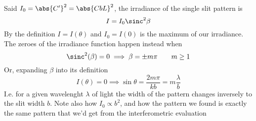 \documentclass[../electromagnetism.tex]{subfiles}
\begin{document}
Said $I_0=\abs{C'}^{2}=\abs{CbL}^2$, the irradiance of the single slit pattern is 
\begin{equation}
	I=I_0\sinc^2\beta
	\label{eq:irradiance.fradiff}
\end{equation}
By the definition $I=I(\theta)$ and $I_0=I(0)$ is the maximum of our irradiance. The zeroes of the irradiance function happen instead when
\begin{equation*}
	\sinc^2(\beta)=0\implies\beta=\pm m\pi\qquad m\ge1
\end{equation*}
Or, expanding $\beta$ into its definition
\begin{equation}
	I(\theta)=0\implies\sin\theta=\frac{2m\pi}{kb}=m\frac{\lambda}{b}
	\label{eq:zeroessingleslit.fradiff}
\end{equation}
I.e. for a given wavelenght $\lambda$ of light the width of the pattern changes inversely to the slit width $b$. Note also how $I_0\propto b^2$, and how the pattern we found is exactly the same pattern that we'd get from the interferometric evaluation
\end{document}
